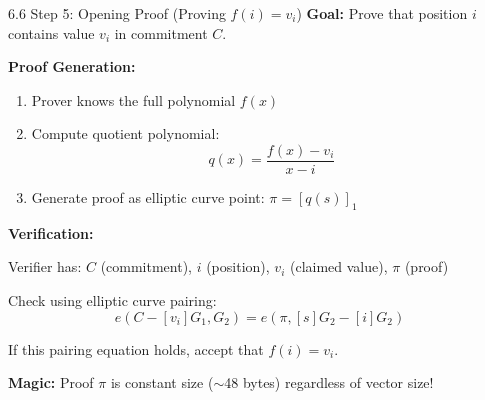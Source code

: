 \documentclass{beamer}
\begin{document}
\begin{frame}{6.6 Step 5: Opening Proof (Proving $f(i) = v_i$)}
    \textbf{Goal:} Prove that position $i$ contains value $v_i$ in commitment $C$.
    
    \vspace{0.3cm}
    \textbf{Proof Generation:}
    \begin{enumerate}
        \item Prover knows the full polynomial $f(x)$
        \item Compute quotient polynomial: 
        \[
        q(x) = \frac{f(x) - v_i}{x - i}
        \]
        \item Generate proof as elliptic curve point: $\pi = [q(s)]_1$
    \end{enumerate}
    
    \pause
    \vspace{0.3cm}
    \textbf{Verification:}
    
    Verifier has: $C$ (commitment), $i$ (position), $v_i$ (claimed value), $\pi$ (proof)
    
    Check using elliptic curve pairing:
    \[
    e(C - [v_i]G_1, G_2) = e(\pi, [s]G_2 - [i]G_2)
    \]
    
    If this pairing equation holds, accept that $f(i) = v_i$.
    
    \pause
    \vspace{0.3cm}
    \textbf{Magic:} Proof $\pi$ is constant size ($\sim$48 bytes) regardless of vector size!
\end{frame}


\end{document}
